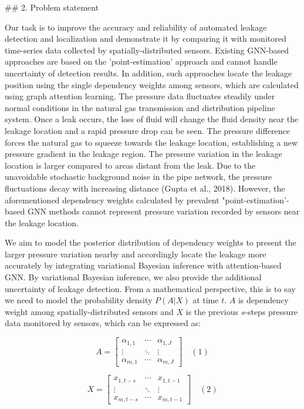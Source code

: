 ## 2.  Problem statement

Our task is to improve the accuracy and reliability of automated leakage detection and localization and demonstrate it by comparing it with monitored time-series data collected by spatially-distributed sensors.  Existing GNN-based approaches are based on the 'point-estimation' approach and cannot handle uncertainty of detection results.  In addition, such approaches locate the leakage position using the single dependency weights among sensors, which are calculated using graph attention learning.  The pressure data fluctuates steadily under normal conditions in the natural gas transmission and distribution pipeline system.  Once a leak occurs, the loss of fluid will change the fluid density near the leakage location and a rapid pressure drop can be seen.  The pressure difference forces the natural gas to squeeze towards the leakage location, establishing a new pressure gradient in the leakage region.  The pressure variation in the leakage location is larger compared to areas distant from the leak.  Due to the unavoidable stochastic background noise in the pipe network, the pressure fluctuations decay with increasing distance (Gupta et al., 2018).  However, the aforementioned dependency weights calculated by prevalent "point-estimation'-based GNN methods cannot represent pressure variation recorded by sensors near the leakage location.

We aim to model the posterior distribution of dependency weights to present the larger pressure variation nearby and accordingly locate the leakage more accurately by integrating variational Bayesian inference with attention-based GNN.  By variational Bayesian inference, we also provide the additional uncertainty of leakage detection.  From a mathematical perspective, this is to say we need to model the probability density $P(A|X)$ at time $t$. $A$ is dependency weight among spatially-distributed sensors and $X$ is the previous $s$-steps pressure data monitored by sensors, which can be expressed as:

$$
A = \begin{bmatrix}
\alpha_{1,1} & \cdots & \alpha_{1,J} \\
\vdots & \ddots & \vdots \\
\alpha_{m,1} & \cdots & \alpha_{m,J}
\end{bmatrix}
\quad (1)
$$

$$
X = \begin{bmatrix}
x_{1,t-s} & \cdots & x_{1,t-1} \\
\vdots & \ddots & \vdots \\
x_{m,t-s} & \cdots & x_{m,t-1}
\end{bmatrix}
\quad (2)
$$

